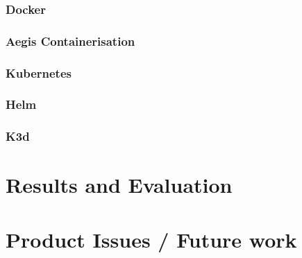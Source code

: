 \documentclass[12pt, conference, final, a4paper, onecolumn, compsoc]{IEEEtran}
\begin{document}
\subsubsection*{Docker}
\paragraph{}

\subsubsection*{Aegis Containerisation}
\paragraph{}

\subsubsection*{Kubernetes}
\paragraph{}

\subsubsection*{Helm}
\paragraph{}

\subsubsection*{K3d}
\paragraph{}

\section{Results and Evaluation}
\subsection*{}

\section{Product Issues / Future work} %
\end{document}
